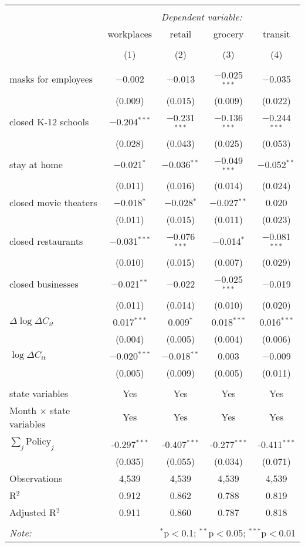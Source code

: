 \begin{tabular}{@{\extracolsep{1pt}}lcccc} 
\\[-1.8ex]\hline 
\hline \\[-1.8ex] 
 & \multicolumn{4}{c}{\textit{Dependent variable:}} \\ 
\cline{2-5} 
 & workplaces & retail & grocery & transit \\ 
\\[-1.8ex] & (1) & (2) & (3) & (4)\\ 
\hline \\[-1.8ex] 
 masks for employees & $-$0.002 & $-$0.013 & $-$0.025$^{***}$ & $-$0.035 \\ 
  & (0.009) & (0.015) & (0.009) & (0.022) \\ 
  closed K-12 schools & $-$0.204$^{***}$ & $-$0.231$^{***}$ & $-$0.136$^{***}$ & $-$0.244$^{***}$ \\ 
  & (0.028) & (0.043) & (0.025) & (0.053) \\ 
  stay at home & $-$0.021$^{*}$ & $-$0.036$^{**}$ & $-$0.049$^{***}$ & $-$0.052$^{**}$ \\ 
  & (0.011) & (0.016) & (0.014) & (0.024) \\ 
  closed movie theaters & $-$0.018$^{*}$ & $-$0.028$^{*}$ & $-$0.027$^{**}$ & 0.020 \\ 
  & (0.011) & (0.015) & (0.011) & (0.023) \\ 
  closed restaurants & $-$0.031$^{***}$ & $-$0.076$^{***}$ & $-$0.014$^{*}$ & $-$0.081$^{***}$ \\ 
  & (0.010) & (0.015) & (0.007) & (0.029) \\ 
  closed businesses & $-$0.021$^{**}$ & $-$0.022 & $-$0.025$^{***}$ & $-$0.019 \\ 
  & (0.011) & (0.014) & (0.010) & (0.020) \\ 
  $\Delta \log \Delta C_{it}$ & 0.017$^{***}$ & 0.009$^{*}$ & 0.018$^{***}$ & 0.016$^{***}$ \\ 
  & (0.004) & (0.005) & (0.004) & (0.006) \\ 
  $\log \Delta C_{it}$ & $-$0.020$^{***}$ & $-$0.018$^{**}$ & 0.003 & $-$0.009 \\ 
  & (0.005) & (0.009) & (0.005) & (0.011) \\ 
 \hline \\[-1.8ex] 
state variables & Yes & Yes & Yes & Yes \\ 
Month $\times$ state variables & Yes & Yes & Yes & Yes \\ 
\hline \\[-1.8ex] 
$\sum_j \mathrm{Policy}_j$ & -0.297$^{***}$ & -0.407$^{***}$ & -0.277$^{***}$ & -0.411$^{***}$ \\ 
 & (0.035) & (0.055) & (0.034) & (0.071) \\ 
Observations & 4,539 & 4,539 & 4,539 & 4,539 \\ 
R$^{2}$ & 0.912 & 0.862 & 0.788 & 0.819 \\ 
Adjusted R$^{2}$ & 0.911 & 0.860 & 0.787 & 0.818 \\ 
\hline 
\hline \\[-1.8ex] 
\textit{Note:}  & \multicolumn{4}{r}{$^{*}$p$<$0.1; $^{**}$p$<$0.05; $^{***}$p$<$0.01} \\ 
\end{tabular} 